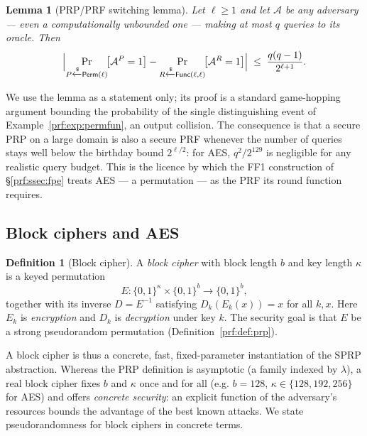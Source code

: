 \documentclass[11pt,a4paper]{article}
\newtheorem{lemma}[theorem]{Lemma}
\theoremstyle{definition}
\newtheorem{definition}[theorem]{Definition}
\theoremstyle{remark}
\begin{document}
\begin{lemma}[PRP/PRF switching lemma]\label{prf:lem:switching}
Let \(\ell \ge 1\) and let \(\mathcal{A}\) be any adversary --- even a computationally unbounded one --- making at most \(q\) queries to its oracle. Then
\[
  \Bigl| \Pr_{P \xleftarrow{\$} \mathsf{Perm}(\ell)}\!\bigl[\mathcal{A}^{P} = 1\bigr]
       - \Pr_{R \xleftarrow{\$} \mathsf{Func}(\ell, \ell)}\!\bigl[\mathcal{A}^{R} = 1\bigr] \Bigr|
  \;\le\; \frac{q(q-1)}{2^{\ell+1}}.
\]
\end{lemma}

We use the lemma as a statement only; its proof is a standard game-hopping argument bounding the probability of the single distinguishing event of Example~\ref{prf:exp:permfun}, an output collision. The consequence is that a secure PRP on a large domain is also a secure PRF whenever the number of queries stays well below the birthday bound \(2^{\ell/2}\): for AES, \(q^2/2^{129}\) is negligible for any realistic query budget. This is the licence by which the FF1 construction of \S\ref{prf:ssec:fpe} treats AES --- a permutation --- as the PRF its round function requires.

\subsection{Block ciphers and AES}\label{prf:ssec:blockcipher}

\begin{definition}[Block cipher]\label{prf:def:blockcipher}
A \emph{block cipher} with block length \(b\) and key length \(\kappa\) is a keyed permutation
\[
  E \colon \{0,1\}^{\kappa} \times \{0,1\}^{b} \longrightarrow \{0,1\}^{b},
\]
together with its inverse \(D = E^{-1}\) satisfying \(D_k(E_k(x)) = x\) for all \(k, x\). Here \(E_k\) is \emph{encryption} and \(D_k\) is \emph{decryption} under key \(k\). The security goal is that \(E\) be a strong pseudorandom permutation (Definition~\ref{prf:def:prp}).
\end{definition}

A block cipher is thus a concrete, fast, fixed-parameter instantiation of the SPRP abstraction. Whereas the PRP definition is asymptotic (a family indexed by \(\lambda\)), a real block cipher fixes \(b\) and \(\kappa\) once and for all (e.g. \(b=128\), \(\kappa \in \{128, 192, 256\}\) for AES) and offers \emph{concrete security}: an explicit function of the adversary's resources bounds the advantage of the best known attacks. We state pseudorandomness for block ciphers in concrete terms.
\end{document}
